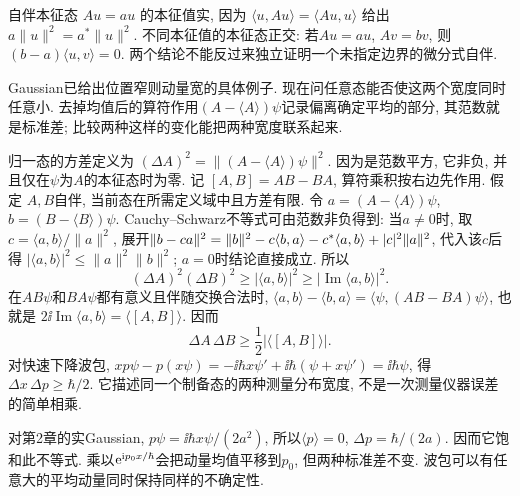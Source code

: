 自伴本征态 $Au=a u$ 的本征值实, 因为 $\langle u,Au\rangle=\langle Au,u\rangle$ 给出 $a\|u\|^2=a^*\|u\|^2$. 不同本征值的本征态正交: 若$Au=au$, $Av=bv$, 则 $(b-a)\langle u,v\rangle=0$. 两个结论不能反过来独立证明一个未指定边界的微分式自伴.

Gaussian已给出位置窄则动量宽的具体例子. 现在问任意态能否使这两个宽度同时任意小. 去掉均值后的算符作用$(A-\langle A\rangle)\psi$记录偏离确定平均的部分, 其范数就是标准差; 比较两种这样的变化能把两种宽度联系起来.

归一态的方差定义为 $(\Delta A)^2=\|(A-\langle A\rangle)\psi\|^2$. 因为是范数平方, 它非负, 并且仅在$\psi$为$A$的本征态时为零. 记 $[A,B]=AB-BA$, 算符乘积按右边先作用. 假定 $A,B$自伴, 当前态在所需定义域中且方差有限. 令 $a=(A-\langle A\rangle)\psi$, $b=(B-\langle B\rangle)\psi$. Cauchy--Schwarz不等式可由范数非负得到: 当$a\ne0$时, 取 $c=\langle a,b\rangle/\|a\|^2$, 展开$\lVert b-ca\rVert^2=\lVert b\rVert^2-c\langle b,a\rangle-c^*\langle a,b\rangle+|c|^2\lVert a\rVert^2$, 代入该$c$后得 $|\langle a,b\rangle|^2\le\|a\|^2\|b\|^2$; $a=0$时结论直接成立. 所以
\[
(\Delta A)^2(\Delta B)^2\ge|\langle a,b\rangle|^2
\ge|\operatorname{Im}\langle a,b\rangle|^2.
\]
在$AB\psi$和$BA\psi$都有意义且伴随交换合法时,
$\langle a,b\rangle-\langle b,a\rangle=\langle\psi,(AB-BA)\psi\rangle$, 也就是 $2\ii\operatorname{Im}\langle a,b\rangle=\langle[A,B]\rangle$. 因而
\begin{equation}\label{eq:uncertainty}
\Delta A\,\Delta B\ge\frac12|\langle[A,B]\rangle|.
\end{equation}
对快速下降波包, $xp\psi-p(x\psi)=-\ii\hbar x\psi'+\ii\hbar(\psi+x\psi')=\ii\hbar\psi$, 得 $\Delta x\,\Delta p\ge\hbar/2$. 它描述同一个制备态的两种测量分布宽度, 不是一次测量仪器误差的简单相乘.

对第2章的实Gaussian, $p\psi=\ii\hbar x\psi/(2a^2)$, 所以$\langle p\rangle=0$, $\Delta p=\hbar/(2a)$. 因而它饱和此不等式. 乘以$\mathrm e^{\mathrm i p_0x/\hbar}$会把动量均值平移到$p_0$, 但两种标准差不变. 波包可以有任意大的平均动量同时保持同样的不确定性.
